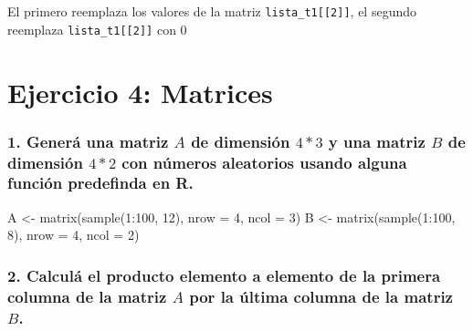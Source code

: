 \documentclass[
]{article}
\newenvironment{Shaded}{\begin{snugshade}}{\end{snugshade}}
\newcommand{\AttributeTok}[1]{\textcolor[rgb]{0.77,0.63,0.00}{#1}}
\newcommand{\DecValTok}[1]{\textcolor[rgb]{0.00,0.00,0.81}{#1}}
\newcommand{\FunctionTok}[1]{\textcolor[rgb]{0.00,0.00,0.00}{#1}}
\newcommand{\NormalTok}[1]{#1}
\newcommand{\OtherTok}[1]{\textcolor[rgb]{0.56,0.35,0.01}{#1}}
\newcommand{\SpecialCharTok}[1]{\textcolor[rgb]{0.00,0.00,0.00}{#1}}
\begin{document}
El primero reemplaza los valores de la matriz
\texttt{lista\_t1{[}{[}2{]}{]}}, el segundo reemplaza
\texttt{lista\_t1{[}{[}2{]}{]}} con 0

\hypertarget{ejercicio-4-matrices}{%
\section{Ejercicio 4: Matrices}\label{ejercicio-4-matrices}}

\hypertarget{generuxe1-una-matriz-a-de-dimensiuxf3n-43-y-una-matriz-b-de-dimensiuxf3n-42-con-nuxfameros-aleatorios-usando-alguna-funciuxf3n-predefinda-en-r.}{%
\subsubsection{\texorpdfstring{1. Generá una matriz \(A\) de dimensión
\(4*3\) y una matriz \(B\) de dimensión \(4*2\) con números aleatorios
usando alguna función predefinda en
R.}{1. Generá una matriz A de dimensión 4*3 y una matriz B de dimensión 4*2 con números aleatorios usando alguna función predefinda en R.}}\label{generuxe1-una-matriz-a-de-dimensiuxf3n-43-y-una-matriz-b-de-dimensiuxf3n-42-con-nuxfameros-aleatorios-usando-alguna-funciuxf3n-predefinda-en-r.}}

\begin{Shaded}
\begin{Highlighting}[]
\NormalTok{A }\OtherTok{\textless{}{-}} \FunctionTok{matrix}\NormalTok{(}\FunctionTok{sample}\NormalTok{(}\DecValTok{1}\SpecialCharTok{:}\DecValTok{100}\NormalTok{, }\DecValTok{12}\NormalTok{), }\AttributeTok{nrow =} \DecValTok{4}\NormalTok{, }\AttributeTok{ncol =} \DecValTok{3}\NormalTok{)}
\NormalTok{B }\OtherTok{\textless{}{-}} \FunctionTok{matrix}\NormalTok{(}\FunctionTok{sample}\NormalTok{(}\DecValTok{1}\SpecialCharTok{:}\DecValTok{100}\NormalTok{, }\DecValTok{8}\NormalTok{), }\AttributeTok{nrow =} \DecValTok{4}\NormalTok{, }\AttributeTok{ncol =} \DecValTok{2}\NormalTok{)}
\end{Highlighting}
\end{Shaded}

\hypertarget{calculuxe1-el-producto-elemento-a-elemento-de-la-primera-columna-de-la-matriz-a-por-la-uxfaltima-columna-de-la-matriz-b.}{%
\subsubsection{\texorpdfstring{2. Calculá el producto elemento a
elemento de la primera columna de la matriz \(A\) por la última columna
de la matriz
\(B\).}{2. Calculá el producto elemento a elemento de la primera columna de la matriz A por la última columna de la matriz B.}}\label{calculuxe1-el-producto-elemento-a-elemento-de-la-primera-columna-de-la-matriz-a-por-la-uxfaltima-columna-de-la-matriz-b.}}
\end{document}
